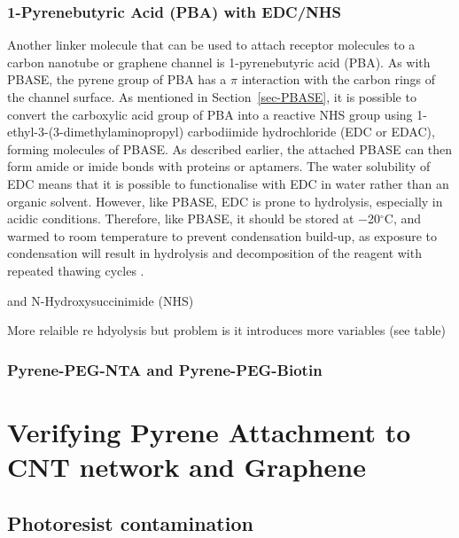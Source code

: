 \documentclass[
  a4paper,
]{scrbook}
\begin{document}
\hypertarget{pyrenebutyric-acid-pba-with-edcnhs}{%
\subsubsection*{1-Pyrenebutyric Acid (PBA) with
EDC/NHS}\label{pyrenebutyric-acid-pba-with-edcnhs}}

Another linker molecule that can be used to attach receptor molecules to
a carbon nanotube or graphene channel is 1-pyrenebutyric acid (PBA). As
with PBASE, the pyrene group of PBA has a \(\pi\) interaction with the
carbon rings of the channel surface. As mentioned in
Section~\ref{sec-PBASE}, it is possible to convert the carboxylic acid
group of PBA into a reactive NHS group using
1-ethyl-3-(3-dimethylaminopropyl) carbodiimide hydrochloride (EDC or
EDAC), forming molecules of PBASE. As described earlier, the attached
PBASE can then form amide or imide bonds with proteins or aptamers. The
water solubility of EDC means that it is possible to functionalise with
EDC in water rather than an organic solvent. However, like PBASE, EDC is
prone to hydrolysis, especially in acidic conditions. Therefore, like
PBASE, it should be stored at −20\(^\circ\)C, and warmed to room
temperature to prevent condensation build-up, as exposure to
condensation will result in hydrolysis and decomposition of the reagent
with repeated thawing cycles \autocite{Hermanson2013-4}.

and N-Hydroxysuccinimide (NHS)

More relaible re hdyolysis but problem is it introduces more variables
(see table)

\hypertarget{pyrene-peg-nta-and-pyrene-peg-biotin}{%
\subsubsection*{Pyrene-PEG-NTA and
Pyrene-PEG-Biotin}\label{pyrene-peg-nta-and-pyrene-peg-biotin}}

\hypertarget{verifying-pyrene-attachment-to-cnt-network-and-graphene}{%
\section{Verifying Pyrene Attachment to CNT network and
Graphene}\label{verifying-pyrene-attachment-to-cnt-network-and-graphene}}

\hypertarget{sec-photoresist-contamination}{%
\subsection{Photoresist
contamination}\label{sec-photoresist-contamination}}
\end{document}
